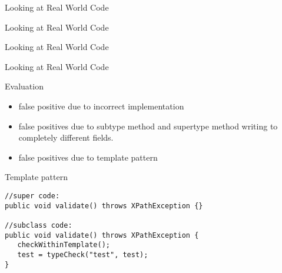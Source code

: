 \documentclass{beamer}
\begin{document}
\begin{frame}{Looking at Real World Code}
\Huge
{}
\end{frame}

\begin{frame}{Looking at Real World Code}
\Huge
{}
\end{frame}

\begin{frame}{Looking at Real World Code}
\Huge
{}
\end{frame}

\begin{frame}{Looking at Real World Code}
\Huge
{}
\end{frame}


\begin{frame}{Evaluation}
\Huge
{}


\Large
\begin{itemize}
  \item {} false positive due to incorrect implementation
  \item {} false positives due to subtype method and supertype  method writing to completely different fields.
  \item {} false positives due to template pattern
\end{itemize}
\end{frame}

\begin{frame}[fragile]{Template pattern}
\begin{lstlisting}
//super code:
public void validate() throws XPathException {}

//subclass code:
public void validate() throws XPathException {
   checkWithinTemplate();
   test = typeCheck("test", test);
}
\end{lstlisting}
\end{frame}
\end{document}
